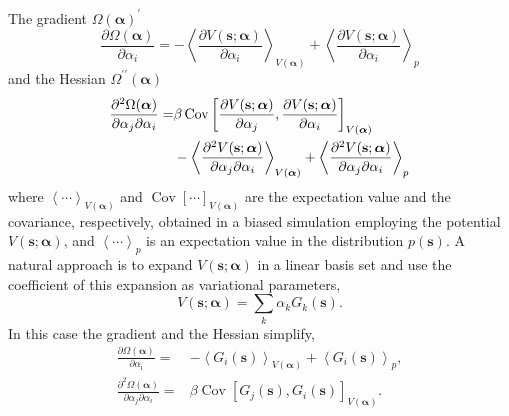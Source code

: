 The gradient $\Omega(\boldsymbol{\alpha})^\prime$
\begin{equation}
    \frac{\partial \Omega(\boldsymbol{\alpha})}{\partial \alpha_{i}}=-\left\langle\frac{\partial V(\mathbf{s} ; \boldsymbol{\alpha})}{\partial \alpha_{i}}\right\rangle_{V(\boldsymbol{\alpha})}+\left\langle\frac{\partial V(\mathbf{s} ; \boldsymbol{\alpha})}{\partial \alpha_{i}}\right\rangle_{p}
\end{equation}
and the Hessian $\Omega^{\prime\prime}(\boldsymbol{\alpha})$
\begin{align} 
    	\frac{\partial^{2} \Omega(\boldsymbol{\alpha})}{\partial \alpha_{j} \partial \alpha_{i}}=& \beta \operatorname{Cov}\left[\frac{\partial V(\mathbf{s} ; \boldsymbol{\alpha})}{\partial \alpha_{j}}, \frac{\partial V(\mathbf{s} ; \boldsymbol{\alpha})}{\partial \alpha_{i}}\right]_{V(\boldsymbol{\alpha})} \notag\\ &-\left\langle\frac{\partial^{2} V(\mathbf{s} ; \boldsymbol{\alpha})}{\partial \alpha_{j} \partial \alpha_{i}}\right\rangle_{V(\boldsymbol{\alpha})}+\left\langle\frac{\partial^{2} V(\mathbf{s} ; \boldsymbol{\alpha})}{\partial \alpha_{j} \partial \alpha_{i}}\right\rangle_{p} 
\end{align}
where $\left<\cdots\right>_{V(\boldsymbol{\alpha})}$ and $\operatorname{Cov}[\cdots]_{V(\boldsymbol{\alpha})}$ are the expectation value and the covariance, respectively, obtained in a biased simulation employing the potential $V(\boldsymbol{\mathbf{s};\alpha})$, and $\left<\cdots\right>_p$ is an expectation value in the distribution $p(\mathbf{s})$. A natural approach is to expand $V(\boldsymbol{\mathbf{s};\alpha})$ in a linear basis set and use the coefficient of this expansion as variational parameters,
\begin{equation}
     V(\boldsymbol{\mathbf{s};\alpha})=\sum_k\alpha_kG_k(\mathbf{s}).
\end{equation}
In this case the gradient and the Hessian simplify,
\begin{align}
    \frac{\partial \Omega(\boldsymbol{\alpha})}{\partial \alpha_{\mathrm{i}}}=&-\left\langle G_i(\mathbf{s})\right\rangle_{V(\boldsymbol{\alpha})}+\left\langle G_i(\mathbf{s})\right\rangle_{p},\\
    \frac{\partial^{2} \Omega(\boldsymbol{\alpha})}{\partial \alpha_j \partial \alpha_i}=&\beta \operatorname{Cov}\left[G_j(\mathbf{s}), G_i(\mathbf{s})\right]_{V(\boldsymbol{\alpha})}.
\end{align}